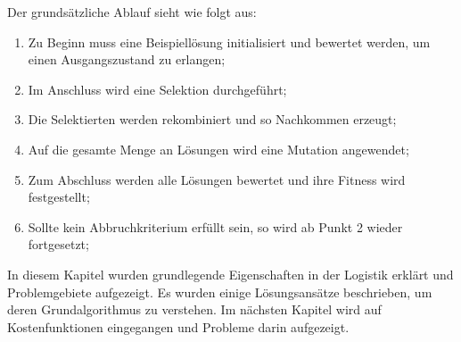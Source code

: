 \noindent
Der grundsätzliche Ablauf sieht wie folgt aus:
\begin{enumerate}
	\item Zu Beginn muss eine Beispiellösung initialisiert und bewertet werden, um einen Ausgangszustand zu erlangen; 
	\item Im Anschluss wird eine Selektion durchgeführt; 
	\item Die Selektierten werden rekombiniert und so Nachkommen erzeugt; 
	\item Auf die gesamte Menge an Lösungen wird eine Mutation angewendet; 
	\item Zum Abschluss werden alle Lösungen bewertet und ihre Fitness wird festgestellt;
	\item Sollte kein Abbruchkriterium erfüllt sein, so wird ab Punkt 2 wieder fortgesetzt; 
\end{enumerate}

\noindent
In diesem Kapitel wurden grundlegende Eigenschaften in der Logistik erklärt und Problemgebiete aufgezeigt. 
Es wurden einige Lösungsansätze beschrieben, um deren Grundalgorithmus zu verstehen. 
Im nächsten Kapitel wird auf Kostenfunktionen eingegangen und Probleme darin aufgezeigt. 